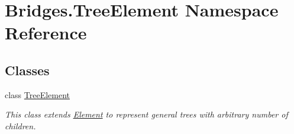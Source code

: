 \hypertarget{namespace_bridges_1_1_tree_element}{}\section{Bridges.\+Tree\+Element Namespace Reference}
\label{namespace_bridges_1_1_tree_element}
\subsection*{Classes}
\begin{DoxyCompactItemize}
\item 
class \mbox{\hyperlink{class_bridges_1_1_tree_element_1_1_tree_element}{Tree\+Element}}
\begin{DoxyCompactList}\small\item\em This class extends \mbox{\hyperlink{namespace_bridges_1_1_element}{Element}} to represent general trees with arbitrary number of children. \end{DoxyCompactList}\end{DoxyCompactItemize}
